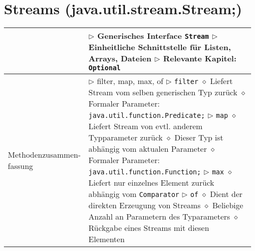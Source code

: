 	
\section{Streams (java.util.stream.Stream;)}
	\begin{tabular}{ | p{} p{} | }
	\hline
	
	\makecell[l]{Information} & \makecell[l]{
	$\rhd$ Generisches Interface \texttt{Stream} \\
	$\rhd$ Einheitliche Schnittstelle für Listen, Arrays, Dateien \\
	$\rhd$ Relevante Kapitel: \texttt{Optional} \\
	} \\ \hline

	\makecell[l]{Methodenzusammen- \\ fassung} & \makecell[l]{
	$\rhd$ filter, map, max, of \\
	$\rhd$ \texttt{filter} \\
	\hspace{0.4cm} $\diamond$ Liefert Stream vom selben generischen Typ zurück \\
	\hspace{0.4cm} $\diamond$ Formaler Parameter: \texttt{java.util.function.Predicate;} \\
	$\rhd$ \texttt{map} \\
	\hspace{0.4cm} $\diamond$ Liefert Stream von evtl. anderem Typparameter zurück \\
	\hspace{0.4cm} $\diamond$ Dieser Typ ist abhängig vom aktualen Parameter \\
	\hspace{0.4cm} $\diamond$ Formaler Parameter: \texttt{java.util.function.Function;} \\
	$\rhd$ \texttt{max} \\
	\hspace{0.4cm} $\diamond$ Liefert nur einzelnes Element zurück abhängig vom \texttt{Comparator} \\
	$\rhd$ \texttt{of} \\
	\hspace{0.4cm} $\diamond$ Dient der direkten Erzeugung von Streams \\
	\hspace{0.4cm} $\diamond$ Beliebige Anzahl an Parametern des Typarameters \\
	\hspace{0.4cm} $\diamond$ Rückgabe eines Streams mit diesen Elementen \\
}
\end{tabular}
